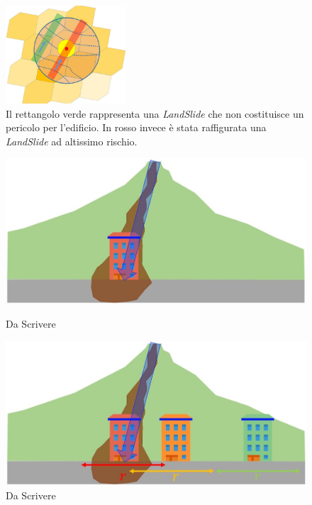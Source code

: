 \begin{enumerate}
	\begin{figure}[h]
		\centering
		\includegraphics[width=0.4\textwidth]{images/landslides}
		\caption{Il rettangolo verde rappresenta una \textit{LandSlide} che non costituisce un pericolo per l'edificio. In rosso invece è stata raffigurata una \textit{LandSlide} ad altissimo rischio.}
	\label{landslides}
	\end{figure}
	

\begin{figure}[h]
	\hspace{0.05\linewidth}
	\begin{minipage}[t]{0.4\linewidth}
		\centering
		\includegraphics[width=\textwidth]{images/landslide2}
		\caption{Da Scrivere}
		\label{landslide2}
	\end{minipage}
	\hspace{0.05\linewidth}
	\begin{minipage}[t]{0.4\linewidth}
		\centering
		\includegraphics[width=\textwidth]{images/landslide3}
		\caption{Da Scrivere }
		\label{landslide3}
	\end{minipage}
\end{figure}
	
\end{enumerate}

